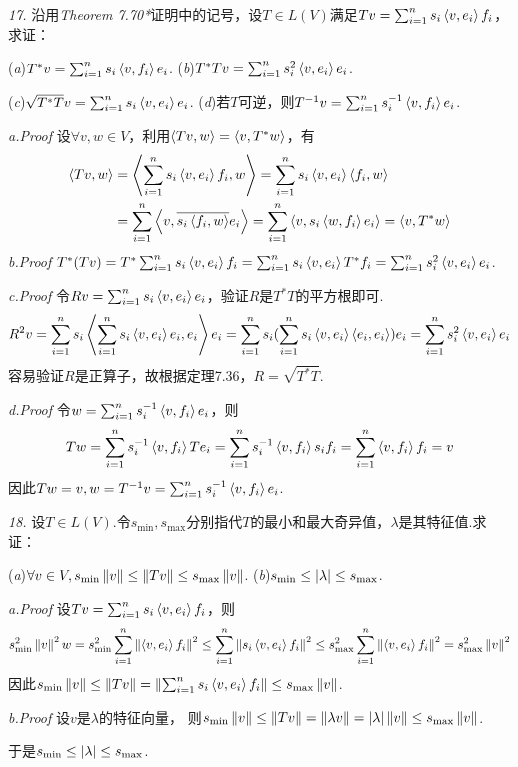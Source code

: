 \newpage

\textit{17.}
沿用\textit{Theorem 7.70*}证明中的记号，设\(T \in L(V)\)满足\(Tv=\sum_{i=1}^n s_i\left\langle v,e_i \right\rangle f_i\)，求证：

(\textit{a})\(T^*v=\sum_{i=1}^n s_i\left\langle v,f_i \right\rangle e_i\). \quad
(\textit{b})\(T^*Tv=\sum_{i=1}^n s_i^2 \left\langle v,e_i \right\rangle e_i\). 

(\textit{c})\(\sqrt{T^*T}v=\sum_{i=1}^n s_i\left\langle v,e_i \right\rangle e_i\). \quad
(\textit{d})若\(T\)可逆，则\(T^{-1}v=\sum_{i=1}^n s_i^{-1}\left\langle v,f_i \right\rangle e_i\).

\textit{a.Proof}
设\(\forall v,w \in V\)，利用\(\left\langle Tv,w \right\rangle=\left\langle v,T^*w \right\rangle\)，有
    \begin{align*}
        \left\langle Tv,w \right\rangle&=\left\langle \sum_{i=1}^n s_i\left\langle v,e_i \right\rangle f_i,w \right\rangle=\sum_{i=1}^n s_i\left\langle v,e_i \right\rangle\left\langle f_i,w \right\rangle \\
        &=\sum_{i=1}^n \left\langle v,\overline{s_i\left\langle f_i,w \right\rangle}e_i \right\rangle=\sum_{i=1}^n \left\langle v,s_i\left\langle w,f_i \right\rangle e_i \right\rangle=\left\langle v,T^*w \right\rangle
    \end{align*}
\textit{b.Proof}
\(T^*(Tv)=T^*\sum_{i=1}^n s_i \left\langle v,e_i \right\rangle f_i=\sum_{i=1}^n s_i \left\langle v,e_i \right\rangle T^*f_i=\sum_{i=1}^n s_i^2 \left\langle v,e_i \right\rangle e_i\).

\textit{c.Proof}
令\(Rv=\sum_{i=1}^n s_i\left\langle v,e_i \right\rangle e_i\)，验证\(R\)是\(T^*T\)的平方根即可.
    \begin{align*}
        R^2v=\sum_{i=1}^n s_i\left\langle \sum_{i=1}^n s_i\left\langle v,e_i \right\rangle e_i,e_i \right\rangle e_i
        =\sum_{i=1}^n s_i (\sum_{i=1}^n s_i\left\langle v,e_i \right\rangle\left\langle e_i,e_i \right\rangle)e_i
        =\sum_{i=1}^n s_i^2\left\langle v,e_i \right\rangle e_i
    \end{align*}
容易验证\(R\)是正算子，故根据定理7.36，\(R=\sqrt{T^*T}\).

\textit{d.Proof}
令\(w=\sum_{i=1}^n s_i^{-1}\left\langle v,f_i \right\rangle e_i\)，则
    \begin{align*}
        Tw=\sum_{i=1}^n s_i^{-1}\left\langle v,f_i \right\rangle Te_i=\sum_{i=1}^n s_i^{-1}\left\langle v,f_i \right\rangle s_if_i
        =\sum_{i=1}^n \left\langle v,f_i \right\rangle f_i=v
    \end{align*}
因此\(Tw=v,w=T^{-1}v=\sum_{i=1}^n s_i^{-1}\left\langle v,f_i \right\rangle e_i\).

\hspace*{\fill}

\textit{18.}
设\(T \in L(V)\).令\(s_{\min},s_{\max}\)分别指代\(T\)的最小和最大奇异值，\(\lambda\)是其特征值.求证：

(\textit{a})\(\forall v \in V,s_{\min}\left\lVert v \right\rVert \leq \left\lVert Tv \right\rVert \leq s_{\max}\left\lVert v \right\rVert\). \quad
(\textit{b})\(s_{\min} \leq \left\lvert \lambda \right\rvert \leq s_{\max}\).

\textit{a.Proof}
设\(Tv=\sum_{i=1}^n s_i\left\langle v,e_i \right\rangle f_i\)，则
    \begin{align*}
        s_{\min}^2\left\lVert v \right\rVert^2w=s_{\min}^2 \sum_{i=1}^n \left\lVert \left\langle v,e_i \right\rangle f_i \right\rVert^2 
        \leq \sum_{i=1}^n \left\lVert s_i\left\langle v,e_i \right\rangle f_i \right\rVert^2 
        \leq s_{\max}^2 \sum_{i=1}^n \left\lVert \left\langle v,e_i \right\rangle f_i \right\rVert^2=s_{\max}^2\left\lVert v \right\rVert^2
    \end{align*}
因此\(s_{\min}\left\lVert v \right\rVert \leq \left\lVert Tv \right\rVert=\left\lVert \sum_{i=1}^n s_i\left\langle v,e_i \right\rangle f_i \right\rVert \leq s_{\max}\left\lVert v \right\rVert\).

\textit{b.Proof}
设\(v\)是\(\lambda\)的特征向量，
则\(s_{\min}\left\lVert v \right\rVert\leq \left\lVert Tv \right\rVert=\left\lVert \lambda v \right\rVert=\left\lvert \lambda \right\rvert\left\lVert v \right\rVert \leq s_{\max}\left\lVert v \right\rVert\).

于是\(s_{\min} \leq \left\lvert \lambda \right\rvert \leq s_{\max}\).

